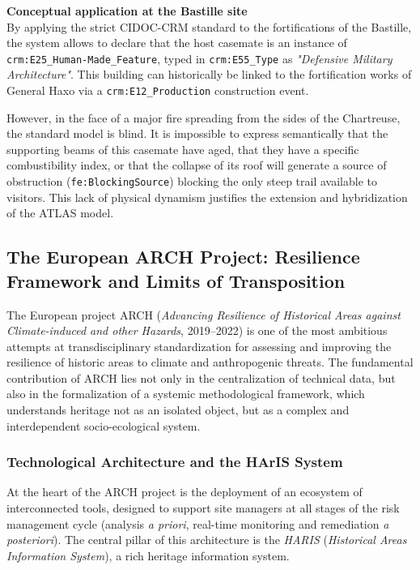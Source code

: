 \documentclass{article}
\begin{document}
\begin{filrouge}
\textbf{Conceptual application at the Bastille site} \\
By applying the strict CIDOC-CRM standard to the fortifications of the Bastille, the system allows to declare that the host casemate is an instance of \texttt{crm:E25\_Human-Made\_Feature}, typed in \texttt{crm:E55\_Type} as \textit{"Defensive Military Architecture"}. This building can historically be linked to the fortification works of General Haxo via a \texttt{crm:E12\_Production} construction event.

However, in the face of a major fire spreading from the sides of the Chartreuse, the standard model is blind. It is impossible to express semantically that the supporting beams of this casemate have aged, that they have a specific combustibility index, or that the collapse of its roof will generate a source of obstruction (\texttt{fe:BlockingSource}) blocking the only steep trail available to visitors. This lack of physical dynamism justifies the extension and hybridization of the ATLAS model.
\end{filrouge}
\subsection{The European ARCH Project: Resilience Framework and Limits of Transposition}
\label{subsec:arch_project_approfondi}

The European project ARCH (\textit{Advancing Resilience of Historical Areas against Climate-induced and other Hazards}, 2019--2022) is one of the most ambitious attempts at transdisciplinary standardization for assessing and improving the resilience of historic areas to climate and anthropogenic threats. The fundamental contribution of ARCH lies not only in the centralization of technical data, but also in the formalization of a systemic methodological framework, which understands heritage not as an isolated object, but as a complex and interdependent socio-ecological system.

\subsubsection{Technological Architecture and the HArIS System}

At the heart of the ARCH project is the deployment of an ecosystem of interconnected tools, designed to support site managers at all stages of the risk management cycle (analysis \textit{a priori}, real-time monitoring and remediation \textit{a posteriori}). The central pillar of this architecture is the \textit{HARIS} (\textit{Historical Areas Information System}), a rich heritage information system.
\end{document}
